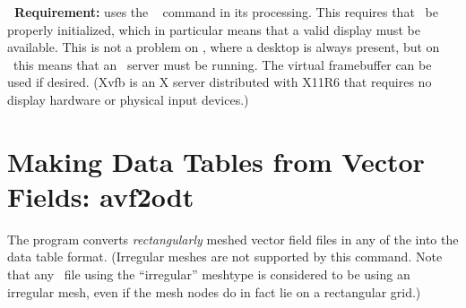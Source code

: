 \textbf{\Tk\ Requirement:}  uses the
\Tk\  command in its processing.  This requires that \Tk\ be
properly initialized, which in particular means that a valid display
must be available.  This is not a problem on \Windows, where a desktop
is always present, but on \Unix\ this means that an \X\ server must be
running.  The
virtual framebuffer can be used if desired.  (Xvfb is an X server
distributed with X11R6 that requires no display hardware or physical
input devices.)


\section{Making Data Tables from Vector Fields:
          avf2odt}\label{sec:avf2odt}%
%
The  program converts \textit{rectangularly} meshed vector field
files in any of the
\HTMLoutput{ (\OVF, \VIO)}
into the  data table format.  (Irregular meshes are
not supported by this command.  Note that any \OVF\ file using the
``irregular'' meshtype is considered to be using an irregular mesh, even
if the mesh nodes do in fact lie on a rectangular grid.)

